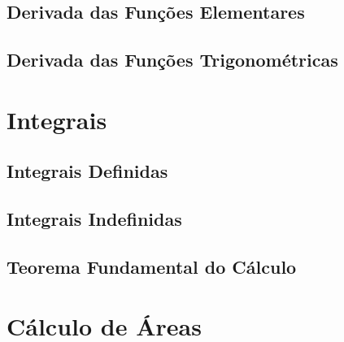 \documentclass[ ]{article}
\begin{document}
	\subsection{Derivada das Funções Elementares}
	\subsection{Derivada das Funções Trigonométricas}
\section{Integrais}
	\subsection{Integrais Definidas}
	\subsection{Integrais Indefinidas}
	\subsection{Teorema Fundamental do Cálculo}
\section{Cálculo de Áreas}
	
\end{document}
